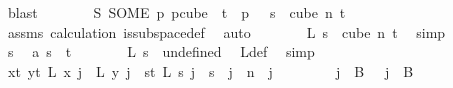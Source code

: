 \begin{isabellebody}
\ blast\isanewline
\ \ \ \ \isamarkupfalse%
\ \isamarkupfalse%
\ {\isachardoublequoteopen}S\ {\isacharparenleft}{\kern0pt}SOME\ p{\isachardot}{\kern0pt}\ p{\isasymin}cube\ {}\ t\ {\isasymand}\ p\ {}\ {\isacharequal}{\kern0pt}\ s{\isacharparenright}{\kern0pt}\ {\isasymin}\ cube\ n\ t{\isachardoublequoteclose}\isanewline
\ \ \ \ \ \ \isamarkupfalse%
\ assms{\isacharparenleft}{\kern0pt}{}{\isacharparenright}{\kern0pt}\ calculation{\isacharparenleft}{\kern0pt}{}{\isacharparenright}{\kern0pt}\ is{\isacharunderscore}{\kern0pt}subspace{\isacharunderscore}{\kern0pt}def\ \isamarkupfalse%
\ auto\isanewline
\ \ \ \ \isamarkupfalse%
\ \isamarkupfalse%
\ {\isachardoublequoteopen}L\ s\ {\isasymin}\ cube\ n\ t{\isachardoublequoteclose}\ \isamarkupfalse%
\ simp\isanewline
\ \ \isamarkupfalse%
\isanewline
\ \ \ \ \isamarkupfalse%
\ s\ \isamarkupfalse%
\ a{\isacharcolon}{\kern0pt}\ {\isachardoublequoteopen}s\ {\isasymnotin}\ {\isacharbraceleft}{\kern0pt}{\isachardot}{\kern0pt}{\isachardot}{\kern0pt}{\isacharless}{\kern0pt}t{\isacharbraceright}{\kern0pt}{\isachardoublequoteclose}\isanewline
\ \ \ \ \isamarkupfalse%
\ \isamarkupfalse%
\ {\isachardoublequoteopen}L\ s\ {\isacharequal}{\kern0pt}\ undefined{\isachardoublequoteclose}\ \isamarkupfalse%
\ L{\isacharunderscore}{\kern0pt}def\ \isamarkupfalse%
\ simp\isanewline
\ \ \isamarkupfalse%
\isanewline
\ \ \isamarkupfalse%
\ \isamarkupfalse%
\ {\isachardoublequoteopen}{\isacharparenleft}{\kern0pt}{\isasymforall}x{\isacharless}{\kern0pt}t{\isachardot}{\kern0pt}\ {\isasymforall}y{\isacharless}{\kern0pt}t{\isachardot}{\kern0pt}\ L\ x\ j\ {\isacharequal}{\kern0pt}\ L\ y\ j{\isacharparenright}{\kern0pt}\ {\isasymor}\ {\isacharparenleft}{\kern0pt}{\isasymforall}s{\isacharless}{\kern0pt}t{\isachardot}{\kern0pt}\ L\ s\ j\ {\isacharequal}{\kern0pt}\ s{\isacharparenright}{\kern0pt}{\isachardoublequoteclose}\ \ {\isachardoublequoteopen}j\ {\isacharless}{\kern0pt}\ n{\isachardoublequoteclose}\ \ j\isanewline
\ \ \isamarkupfalse%
{\isacharminus}{\kern0pt}\isanewline
\ \ \ \ \isamarkupfalse%
\ {\isachardoublequoteopen}j\ {\isasymin}\ B\ {}{\isachardoublequoteclose}\ {\isacharbar}{\kern0pt}\ {\isachardoublequoteopen}j\ {\isasymin}\ B\ {}{\isachardoublequoteclose}\ \isamarkupfalse%

\end{isabellebody}
